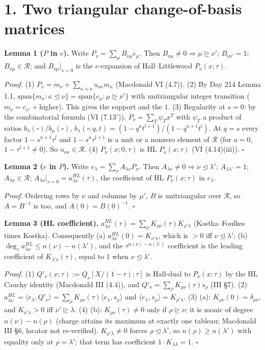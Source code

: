 \documentclass[10pt]{article}
\newcommand{\R}{\mathcal{R}}
\newcommand{\dom}{\trianglerighteq}
\newcommand{\domle}{\trianglelefteq}
\begin{document}
\section*{1. Two triangular change-of-basis matrices}
\textbf{Lemma 1 ($P$ in $e$).} Write $P_\nu=\sum_\mu B_{\nu\mu}e_\mu$. Then $B_{\nu\mu}\ne0\Rightarrow\mu\dom\nu'$; $B_{\nu\nu'}=1$; $B_{\nu\mu}\in\R$; and $B_{\nu\mu}|_{s=0}$ is the $e$-expansion of Hall--Littlewood $P_\nu(x;\tau)$.

\noindent\emph{Proof.} (1) $P_\nu=m_\nu+\sum_{\kappa\lhd\nu}u_{\nu\kappa}m_\kappa$ (Macdonald VI (4.7)).
(2) By Day 214 Lemma 1.1, $\mathrm{span}\{m_\kappa:\kappa\domle\nu\}=\mathrm{span}\{e_\mu:\mu\dom\nu'\}$ with unitriangular integer transition ($m_\nu=e_{\nu'}+$higher). This gives the support and the $1$.
(3) Regularity at $s=0$: by the combinatorial formula (VI (7.13$'$)), $P_\nu=\sum_T\psi_Tx^T$ with $\psi_T$ a product of ratios $b_\lambda(\square)/b_\mu(\square)$, $b_\lambda(\square;q,t)=(1-q^at^{l+1})/(1-q^{a+1}t^l)$. At $q=s$ every factor $1-s^{a+1}\tau^l$ and $1-s^a\tau^{l+1}$ is a unit or a nonzero element of $\R$ (for $a=0$, $1-\tau^{l+1}\neq0$). So $u_{\nu\kappa}\in\R$.
(4) $P_\nu(x;0,\tau)$ is HL $P_\nu(x;\tau)$ (VI (4.14)(iii)). $\square$

\smallskip
\noindent\textbf{Lemma 2 ($e$ in $P$).} Write $e_\lambda=\sum_\nu A_{\lambda\nu}P_\nu$. Then $A_{\lambda\nu}\ne0\Rightarrow\nu\domle\lambda'$; $A_{\lambda\lambda'}=1$; $A_{\lambda\nu}\in\R$; $A_{\lambda\nu}|_{s=0}=a^{HL}_{\lambda\nu}(\tau)$, the coefficient of HL $P_\nu(x;\tau)$ in $e_\lambda$.

\noindent\emph{Proof.} Ordering rows by $\nu$ and columns by $\mu'$, $B$ is unitriangular over $\R$, so $A=B^{-1}$ is too, and $A(0)=B(0)^{-1}$. $\square$

\smallskip
\noindent\textbf{Lemma 3 (HL coefficient).} $a^{HL}_{\lambda\nu}(\tau)=\sum_\rho K_{\rho\nu}(\tau)K_{\rho'\lambda}$ (Kostka--Foulkes times Kostka). Consequently
(a) $a^{HL}_{\lambda\nu}(0)=K_{\nu'\lambda}$, which is $>0$ iff $\nu\domle\lambda'$;
(b) $\deg_\tau a^{HL}_{\lambda\nu}\le n(\nu)-n(\lambda')$, and the $\tau^{n(\nu)-n(\lambda')}$ coefficient is the leading coefficient of $K_{\lambda'\nu}(\tau)$, equal to $1$ when $\nu\domle\lambda'$.

\noindent\emph{Proof.} (1) $Q'_\nu(x;\tau):=Q_\nu[X/(1-\tau);\tau]$ is Hall-dual to $P_\nu(x;\tau)$ by the HL Cauchy identity (Macdonald III (4.4)), and $Q'_\nu=\sum_\rho K_{\rho\nu}(\tau)s_\rho$ (III \S7).
(2) $a^{HL}_{\lambda\nu}=\langle e_\lambda,Q'_\nu\rangle=\sum_\rho K_{\rho\nu}(\tau)\langle e_\lambda,s_\rho\rangle$ and $\langle e_\lambda,s_\rho\rangle=K_{\rho'\lambda}$.
(3) (a): $K_{\rho\nu}(0)=\delta_{\rho\nu}$, and $K_{\nu'\lambda}>0$ iff $\nu'\dom\lambda$.
(4) (b): $K_{\rho\nu}(\tau)\ne0$ only if $\rho\dom\nu$; it is monic of degree $n(\nu)-n(\rho)$ (charge attains its maximum at exactly one tableau; Macdonald III \S6, locator not re-verified). $K_{\rho'\lambda}\ne0$ forces $\rho\domle\lambda'$, so $n(\rho)\ge n(\lambda')$ with equality only at $\rho=\lambda'$; that term has coefficient $1\cdot K_{\lambda\lambda}=1$. $\square$
\end{document}

